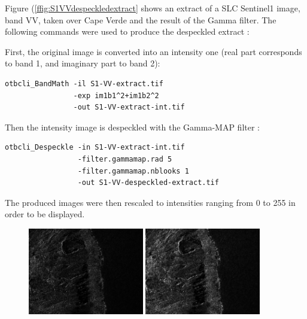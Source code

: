Figure (\ref{ffig:S1VVdespeckledextract} shows an extract of a SLC Sentinel1
image, band VV, taken over Cape Verde and the result of the Gamma filter. The
following commands were used to produce the despeckled extract :

First, the original image is converted into an intensity one (real part
corresponds to band 1, and imaginary part to band 2):

\begin{verbatim} 
otbcli_BandMath -il S1-VV-extract.tif 
                -exp im1b1^2+im1b2^2 
                -out S1-VV-extract-int.tif 
\end{verbatim}

Then the intensity image is despeckled with the Gamma-MAP filter :

\begin{verbatim} 
otbcli_Despeckle -in S1-VV-extract-int.tif 
                 -filter.gammamap.rad 5
                 -filter.gammamap.nblooks 1 
                 -out S1-VV-despeckled-extract.tif 
\end{verbatim}

The produced images were then rescaled to intensities ranging from 0 to 255 in
order to be displayed.

\begin{figure}[!h]
  \center
  \includegraphics[width=0.45\textwidth]{../Art/S1-VV-extract-int.png}
  \includegraphics[width=0.45\textwidth]{../Art/S1-VV-despeckled-extract.png}
  \label{fig:S1VVdespeckledextract}
\end{figure}

